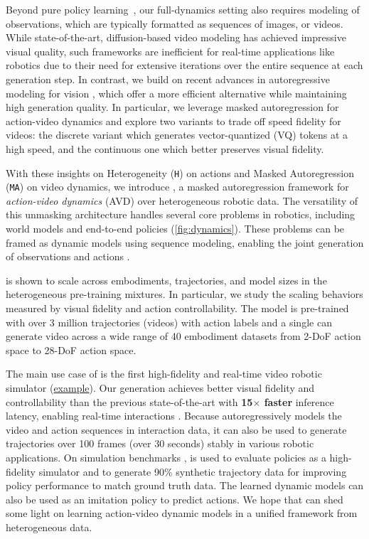 Beyond pure policy learning~\cite{wang2024scaling}, our full-dynamics setting also requires modeling of observations, which are typically formatted as sequences of images, or videos. While state-of-the-art, diffusion-based video modeling \cite{zhu2024irasim,videoworldsimulators2024,rigter2024avid} has achieved impressive visual quality, such frameworks are inefficient for real-time applications like robotics due to their need for extensive iterations over the entire sequence at each generation step. In contrast, we build on recent advances in autoregressive modeling for vision \cite{li2024autoregressive,liu2024mardini,tian2024visual}, which offer a more efficient alternative while maintaining high generation quality. In particular, we leverage masked autoregression \cite{chang2022maskgit,li2024autoregressive} for action-video dynamics and explore two variants to trade off speed \vs fidelity for videos: the discrete variant which generates vector-quantized (VQ) tokens at a high speed, and the continuous one which better preserves visual fidelity.


With these insights on Heterogeneity (\texttt{H}) on actions and Masked Autoregression (\texttt{MA}) on video dynamics, we introduce \ourshort, a masked autoregression framework for \textit{action-video dynamics} (AVD) over heterogeneous robotic data. The versatility of this unmasking architecture handles several core problems in robotics, including world models and end-to-end policies (\cref{fig:dynamics}). These problems can be framed as dynamic models using sequence modeling, enabling the joint generation of observations and actions \cite{chen2021decision, radosavovic2024humanoid}. 



\ourshort is shown to scale across embodiments, trajectories, and model sizes in the heterogeneous pre-training mixtures. In particular, we study the scaling behaviors measured by visual fidelity and action controllability. The model is pre-trained with over 3 million trajectories (videos) with action labels and a single \ourshort can generate video across a wide range of 40 embodiment datasets from 2-DoF action space to 28-DoF action space. 


The main use case of \ourshort is the first high-fidelity and real-time video robotic simulator (\href{https://liruiw.github.io/hma/hma_demo}{example}). Our generation achieves better visual fidelity and controllability than the previous state-of-the-art \cite{zhu2024irasim} with \textbf{15$\times$ faster} inference latency, enabling real-time interactions \cite{lynch2023interactive}. Because \ourshort autoregressively models the video and action sequences in interaction data, it can also be used to generate trajectories over 100 frames (over 30 seconds) stably in various robotic applications. On simulation benchmarks \cite{robomimic2021}, \ourshort is used to evaluate policies as a high-fidelity simulator and to generate 90\% synthetic trajectory data for improving policy performance to match ground truth data. The learned dynamic models can also be used as an imitation policy to predict actions. We hope that \ourshort can shed
some light on learning action-video dynamic models in a unified framework from heterogeneous data. 


